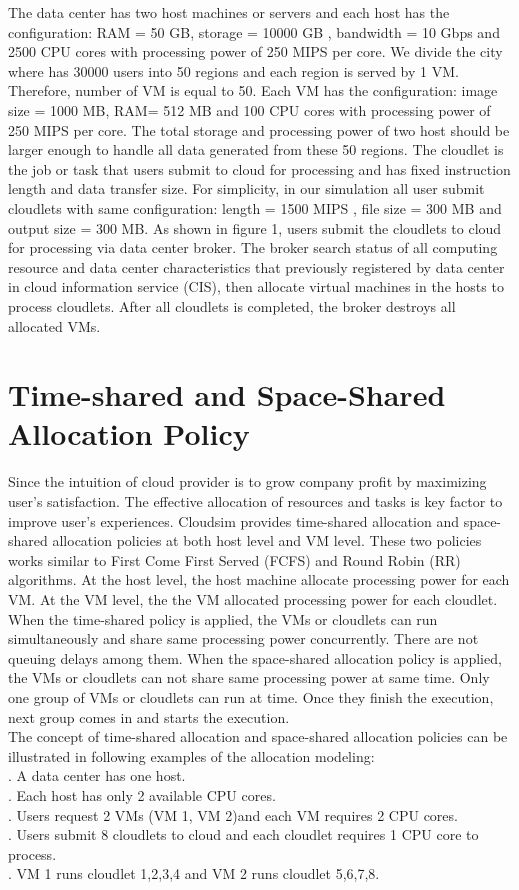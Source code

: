 \documentclass[12pt]{article}
\begin{document}
\indent The data center has two host machines or servers and each host has the configuration: RAM = 50 GB,  storage  = 10000 GB , bandwidth = 10 Gbps and  2500 CPU cores with processing power of 250 MIPS per core.  We divide the city where has 30000 users into 50 regions and each region is served by 1 VM.  Therefore, number of VM is equal to 50.  Each VM has the configuration: image size = 1000 MB, RAM= 512 MB and 100 CPU cores with processing power of 250 MIPS per core. The total storage and processing power of two host should be larger enough to handle all data  generated from these 50 regions.  The cloudlet is the  job or task that users submit to cloud for processing and has fixed instruction length and data transfer size. For simplicity, in our simulation all user submit cloudlets with same configuration: length = 1500 MIPS , file size = 300 MB and output size = 300 MB.
\indent As shown in figure 1, users submit the cloudlets to cloud for processing via data center broker.  The broker search status of all computing resource and data center characteristics that previously registered by data center in cloud information service (CIS), then allocate virtual machines in the hosts to process cloudlets. After all cloudlets is completed, the broker destroys all allocated VMs.

\section{Time-shared and Space-Shared Allocation Policy}
Since the intuition of cloud provider is to grow company profit by maximizing user's satisfaction. The effective allocation of resources and tasks is key factor to improve user's experiences. Cloudsim provides time-shared allocation and space-shared allocation policies at both host level and VM level.  These two policies works similar to First Come
First Served (FCFS) and Round Robin (RR) algorithms\cite{ok3}. At the host level, the host machine allocate processing power for each VM.  At the VM level, the the VM allocated processing power for each cloudlet.  When the time-shared policy is applied, the VMs or cloudlets can run simultaneously and share same processing power concurrently. There are not queuing delays among them.  When the space-shared allocation policy is applied, the VMs or cloudlets can not share same processing power at same time. Only one group of VMs or cloudlets can run at time. Once they finish the execution, next group comes in and starts the execution.\\
\indent The concept of time-shared allocation and space-shared allocation policies can be illustrated in following examples of the allocation modeling:\\
. A data center has one host. \\
. Each host has only 2 available CPU cores.\\
. Users request 2 VMs (VM 1, VM 2)and each VM requires 2 CPU cores.\\
. Users submit 8 cloudlets to cloud and each cloudlet requires 1 CPU core to process. \\
. VM 1 runs cloudlet 1,2,3,4 and VM 2 runs cloudlet 5,6,7,8.
\end{document}
